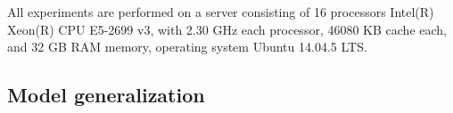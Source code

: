 \documentclass[conference]{IEEEtran}
\newcommand{\todo}[1]
  {{\scriptsize \textbf{\color{red} {#1}}}}
\begin{document}
All experiments are performed on a server 
consisting of 16 processors Intel(R) Xeon(R) CPU E5-2699 v3, with 2.30 GHz each
processor, 46080 KB cache each, and 32 GB RAM memory, operating system Ubuntu 
14.04.5 LTS.

\subsection{Model generalization}
\label{sec:generalize}
  

\end{document}

